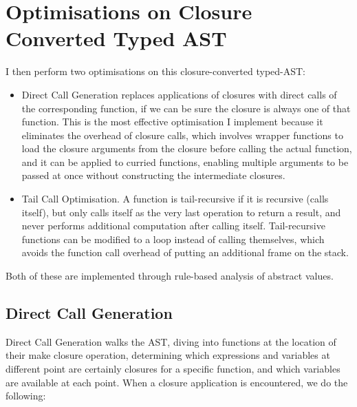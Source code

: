 \documentclass[12pt,twoside,notitlepage]{report}
\newcommand{\textinline}{\texttt}
\begin{document}
\section{Optimisations on Closure Converted Typed AST}
I then perform two optimisations on this closure-converted typed-AST:
\begin{itemize}
	\item Direct Call Generation replaces applications of closures with direct calls of the corresponding function, if we can be sure the closure is always one of that function. This is the most effective optimisation I implement because it eliminates the overhead of closure calls, which involves wrapper functions to load the closure arguments from the closure before calling the actual function, and it can be applied to curried functions, enabling multiple arguments to be passed at once without constructing the intermediate closures.
	\item Tail Call Optimisation. A function is tail-recursive if it is recursive (calls itself), but only calls itself as the very last operation to return a result, and never performs additional computation after calling itself. Tail-recursive functions can be modified to a loop instead of calling themselves, which avoids the function call overhead of putting an additional frame on the stack.
\end{itemize}
Both of these are implemented through rule-based analysis of abstract values.

\subsection{Direct Call Generation}
Direct Call Generation walks the AST, diving into functions at the location of their make closure operation, determining which expressions and variables at different point are certainly closures for a specific function, and which variables are available at each point. When a closure application is encountered, we do the following:
\end{document}
